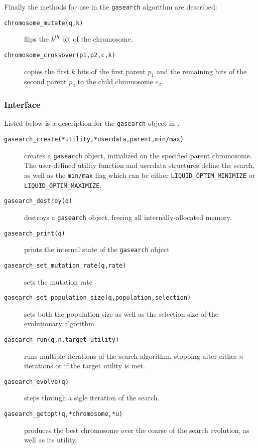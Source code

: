 %
Finally the methods for use in the {\tt gasearch} algorithm are
described:
%
\begin{description}
\item[{\tt chromosome\_mutate(q,k)}]
    flips the $k^{th}$ bit of the chromosome.
\item[{\tt chromosome\_crossover(p1,p2,c,k)}]
    copies the first $k$ bits of the first parent $p_1$
    and the remaining bits of the second parent $p_2$
    to the child chromosome $c_2$.
\end{description}
%

\subsubsection{Interface}
\label{module:optim:gasearch:interface}
%
Listed below is a description for the {\tt gasearch} object in
\liquid.
%
\begin{description}
\item[{\tt gasearch\_create(*utility,*userdata,parent,min/max)}]
    creates a {\tt gasearch} object, initialized on the specified
    parent chromosome.
    The user-defined utility function and userdata structures define the
    search, as well as the {\tt min/max} flag which can be either
    {\tt LIQUID\_OPTIM\_MINIMIZE} or
    {\tt LIQUID\_OPTIM\_MAXIMIZE}.
\item[{\tt gasearch\_destroy(q)}]
    destroys a {\tt gasearch} object, freeing all internally-allocated
    memory.
\item[{\tt gasearch\_print(q)}]
    prints the internal state of the {\tt gasearch} object
\item[{\tt gasearch\_set\_mutation\_rate(q,rate)}]
    sets the mutation rate
\item[{\tt gasearch\_set\_population\_size(q,population,selection)}]
    sets both the population size as well as the selection size of the
    evolutionary algorithm
\item[{\tt gasearch\_run(q,n,target\_utility)}]
    runs multiple iterations of the search algorithm,
    stopping after either $n$ iterations or if the target utility is
    met.
\item[{\tt gasearch\_evolve(q)}]
    steps through a sigle iteration of the search.
\item[{\tt gasearch\_getopt(q,*chromosome,*u)}]
    produces the best chromosome over the coarse of the search
    evolution, as well as its utility.
\end{description}
%

